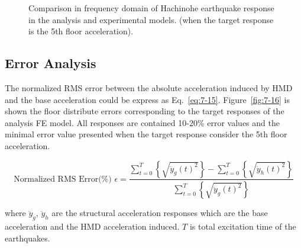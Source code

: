 \begin{figure}[!ht]
{   \label{fig:7-15e}\hfill
}
\caption{Comparison in frequency domain of Hachinohe earthquake response in the analysis and experimental models. (when the target response is the 5th floor acceleration).}
\label{fig:7-15}
\end{figure}

\subsection{Error Analysis}

The normalized RMS error between the absolute acceleration induced by HMD and the base acceleration could be express as Eq.~\eqref{eq:7-15}. Figure~\ref{fig:7-16} is shown the floor distribute errors corresponding to the target responses of the analysis FE model. All responses are contained 10-20\% error values and the minimal error value presented when the target response consider the 5th floor acceleration.

\begin{equation}\label{eq:7-15}
\text{Normalized RMS Error(\%) } \epsilon = \frac{\sum_{t=0}^{T}\left\{\sqrt{\ddot{y}_{g}(t)^{2}}\right\} - \sum_{t=0}^{T}\left\{\sqrt{\ddot{y}_{h}(t)^{2}}\right\}}{\sum_{t=0}^{T}\left\{\sqrt{\ddot{y}_{g}(t)^{2}}\right\}}
\end{equation}

where $\ddot{y}_{g}$, $\ddot{y}_{h}$ are the structural acceleration responses which are the base acceleration and the HMD acceleration induced. $T$ is total excitation time of the earthquakes.

